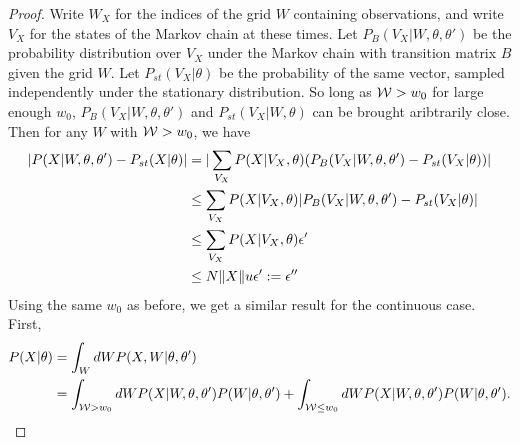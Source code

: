 \begin{proof}
Write $W_X$ for the indices of the grid $W$ containing observations, and write $V_X$
for the states of the Markov chain at these times.
Let $P_B(V_X | W, \theta, \theta')$ be the probability distribution over
$V_X$ under the Markov chain with transition matrix $B$ given the grid $W$.
Let $P_{st}(V_X|\theta)$ be the  probability of the same vector, sampled
independently under the stationary distribution. So
long as ${\mathcal W} > w_{0}$ for large enough $w_0$,
$P_B(V_X | W, \theta, \theta')$ and  $P_{st}(V_X | W, \theta)$ can be
brought aribtrarily close.
Then for any $W$ with ${\mathcal W} > w_0$, we have
\begin{align*}
|P(X|W , \theta, \theta') - P_{st}(X | \theta)| &= | \sum_{V_X} P(X|V_X, \theta)(P_B(V_X | W, \theta, \theta') -  P_{st}(V_X | \theta))|\\
& \leq \sum_{V_X} P(X | V_X, \theta)|P_B(V_X | W, \theta, \theta') -  P_{st}(V_X | \theta)|\\
& \leq \sum_{V_X} P(X | V_X, \theta){\epsilon'}\\
& \leq N \| X \| u \epsilon' := \epsilon''
\end{align*}
Using the same $w_{0}$ as before, we get a similar result for the
continuous case. First,
\begin{align*}
P(X | \theta) &= \int_W dW P(X , W | \theta, \theta')\\
&= \int_{\mW > w_0} dW P(X | W, \theta, \theta') P(W | \theta, \theta') + \int_{\mW \leq w_0}dW P(X | W, \theta, \theta') P(W | \theta, \theta').

\end{align*}
\end{proof}
